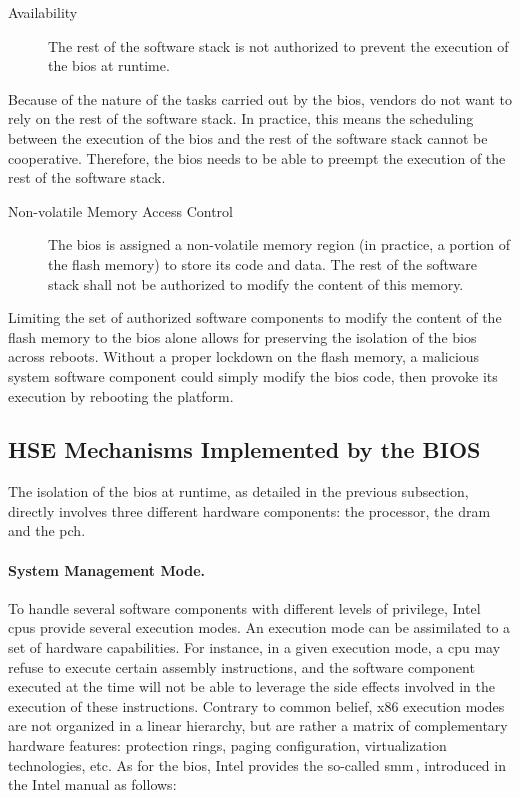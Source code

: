 \begin{description}
\item [Availability]
  The rest of the software stack is not authorized to prevent the execution of
  the \ac{bios} at runtime.
\end{description}

Because of the nature of the tasks carried out by the \ac{bios}, vendors do not
want to rely on the rest of the software stack.
%
In practice, this means the scheduling between the execution of the \ac{bios}
and the rest of the software stack cannot be cooperative.
%
Therefore, the
\ac{bios} needs to be able to preempt the execution of the rest of the software
stack.

\begin{description}
\item [Non-volatile Memory Access Control]
  The \ac{bios} is assigned a non-volatile memory region (in practice, a portion
  of the flash memory) to store its code and data.
  The rest of the software stack shall not be authorized to modify the content
  of this memory.
\end{description}

Limiting the set of authorized software components to modify the content of the
flash memory to the \ac{bios} alone allows for preserving the isolation of the
\ac{bios} across reboots.
%
Without a proper lockdown on the flash memory, a malicious system software
component could simply modify the \ac{bios} code, then provoke its execution by
rebooting the platform.

\subsection{HSE Mechanisms Implemented by the BIOS}
\label{subsec:usecase:hse:smm}

The isolation of the \ac{bios} at runtime, as detailed in the previous
subsection, directly involves three different hardware components: the
processor, the \ac{dram} and the \ac{pch}.

\paragraph{System Management Mode.}
%
To handle several software components with different levels of privilege, Intel
\acp{cpu} provide several execution modes.
%
An execution mode can be assimilated to a set of hardware capabilities.
%
For instance, in a given execution mode, a \ac{cpu} may refuse to execute
certain assembly instructions, and the software component executed at the time
will not be able to leverage the side effects involved in the execution of these
instructions.
%
Contrary to common belief, x86 execution modes are not organized in a linear
hierarchy, but are rather a matrix of complementary hardware features:
protection rings, paging configuration, virtualization technologies, etc.
%
As for the \ac{bios}, Intel provides the so-called \ac{smm}\,\cite[Volume 3,
Chapter 34]{intel2014manual}, introduced in the Intel manual as follows:

